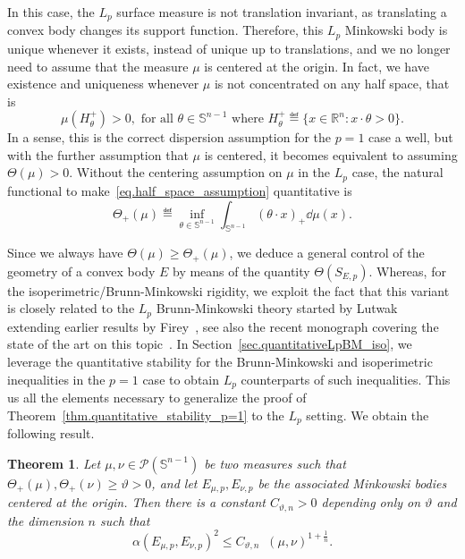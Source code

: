 \documentclass[a4paper, 10pt, twoside]{amsart}
\numberwithin{equation}{section}
\newcommand{\theoname}{Theorem}
\theoremstyle{plain}
\newtheorem{theorem}{\theoname}[section]
\theoremstyle{definition}
\DeclareMathOperator{\dc}{\mathrm{d}_\mathrm{C}}
\begin{document}
In this case, the $L_p$ surface measure is not translation invariant, as translating a convex body changes its support function. Therefore, this $L_p$ Minkowski body is unique whenever it exists, instead of unique up to translations, and we no longer need to assume that the measure $\mu$ is centered at the origin. In fact, we have existence and uniqueness whenever $\mu$ is not concentrated on any half space, that is 
\begin{equation}\label{eq.half_space_assumption}
    \mu(H_\theta^+) > 0, \text{ for all $\theta \in \mathbb{S}^{n-1}$ where }
    H_\theta^+ \eqdef \{
        x \in \mathbb{R}^n : x\cdot \theta > 0
    \}.
\end{equation}
In a sense, this is the correct dispersion assumption for the $p = 1$ case a well, but with the further assumption that $\mu$ is centered, it becomes equivalent to assuming $\Theta(\mu) > 0$. Without the centering assumption on $\mu$ in the $L_p$ case, the natural functional to make~\eqref{eq.half_space_assumption} quantitative is 
\begin{equation}
    \Theta_+(\mu) 
    \eqdef 
    \inf_{\theta \in \mathbb{S}^{n-1}} 
    \int_{\mathbb{S}^{n-1}} 
    (\theta\cdot x)_+ \dd \mu(x). 
\end{equation}

Since we always have $\Theta(\mu) \ge \Theta_+(\mu)$, we deduce a general control of the geometry of a convex body $E$ by means of the quantity $\Theta(S_{E,p})$. Whereas, for the isoperimetric/Brunn-Minkowski rigidity, we exploit the fact that this variant is closely related to the $L_p$ Brunn-Minkowski theory started by 
Lutwak~\cite{lutwak1992brunn-minkowki-firey,lutwak1996brunn} extending earlier results by Firey~\cite{firey1962p,firey1974shapes}, see also the recent monograph covering the state of the art on this topic~\cite{boroczky2025isoperimetric}. In Section~\ref{sec.quantitativeLpBM_iso}, we leverage the quantitative stability for the Brunn-Minkowski and isoperimetric inequalities in the $p = 1$ case to obtain $L_p$ counterparts of such inequalities. This us all the elements necessary to generalize the proof of Theorem~\ref{thm.quantitative_stability_p=1} to the $L_p$ setting. We obtain the following result. 

\begin{theorem}\label{thm.quantitative_stability_p}
    Let $\mu, \nu \in \mathscr{P}(\mathbb{S}^{n-1})$ be two measures such that $\Theta_+(\mu), \Theta_+(\nu) \ge \vartheta >0$, and let $E_{\mu,p}, E_{\nu,p}$ be the associated Minkowski bodies centered at the origin. Then there is a constant $C_{\vartheta,n} >0$ depending only on $\vartheta$ and the dimension $n$ such that 
    \begin{equation}
        {\alpha(E_{\mu,p}, E_{\nu,p})}^2
        \le 
        C_{\vartheta,n} {\dc(\mu, \nu)}^{1 + \frac{1}{n}}.
    \end{equation}
\end{theorem}
\end{document}

